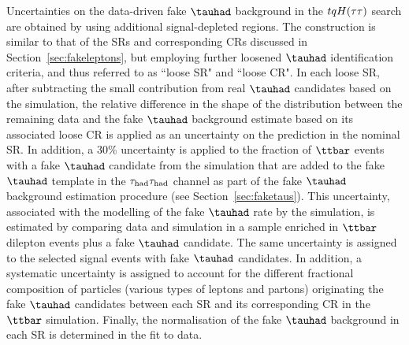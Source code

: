 Uncertainties on the data-driven fake $\tauhad$ background in the $tqH(\tau\tau)$ search are obtained by using additional signal-depleted regions. The construction is similar to that of the SRs and corresponding CRs discussed in Section~\ref{sec:fakeleptons}, but employing further loosened $\tauhad$ identification criteria, and thus referred to as ``loose SR"  and ``loose CR". 
In each loose SR, after subtracting the small contribution from real $\tauhad$ candidates based on the simulation, 
the relative difference in the shape of the distribution between the remaining data and the fake $\tauhad$ background estimate based on its associated loose CR 
is applied as an uncertainty on the prediction in the nominal SR.
In addition, a 30\% uncertainty is applied to the fraction of $\ttbar$ events with a fake $\tauhad$ candidate from the simulation that are added to the fake $\tauhad$ template in the $\tau_{\mathrm{had}} \tau_{\mathrm{had}}$ channel as part of the fake $\tauhad$ background estimation procedure (see Section~\ref{sec:faketaus}). This uncertainty, associated with the modelling of the fake $\tauhad$ rate by the simulation, is estimated by comparing data and simulation in a sample enriched in $\ttbar$ dilepton events plus a fake $\tauhad$ candidate. 
The same uncertainty is assigned to the selected signal events with fake $\tauhad$ candidates.
In addition, a systematic uncertainty is assigned to account for the different fractional composition of particles (various types of leptons and partons) originating the fake $\tauhad$ candidates 
between each SR and its corresponding CR in the $\ttbar$ simulation. 
Finally, the normalisation of the fake $\tauhad$ background in each SR is determined in the fit to data. 

